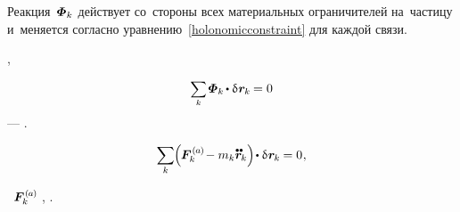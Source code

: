 \begin{otherlanguage}{russian}
Реакция~$\mathboldPhi_k$
действует со~стороны всех материальных ограничителей
на~частицу 
и~меняется согласно уравнению~\eqref{holonomicconstraint}
для каждой связи.

,

\nopagebreak
\begin{equation}\label{theidealityofconstraints}
\scalebox{.9}{$\displaystyle \sum_{\smash{k}}$} \hspace{.2ex} \mathboldPhi_k \hspace{-0.2ex} \dotp \variation{\hspace{.1ex}\locationvector_{\hspace{-0.1ex}k}} \hspace{-0.16ex} = 0
\vspace{-0.25em}\end{equation}
\noindent
\:---
.


\nopagebreak\vspace{-0.2em}
\begin{equation}\label{discrete:principleofvirtualwork}
\displaystyle \sum_{\smash{k}} \hspace{-0.1ex} \Bigl( \hspace{-0.1ex}
\activeforcewithindex{k} \hspace{-0.2ex} - m_k \mathdotdotabove{\locationvector}_{\hspace{-0.1ex}k}
\Bigr) \hspace{-0.3ex} \dotp \variation{\hspace{.1ex}\locationvector_{\hspace{-0.1ex}k}} \hspace{-0.1ex} = 0
\hspace{.1ex} ,
\vspace{-0.3em}
\end{equation}

\vspace{-0.2em}\noindent
{}~${\activeforcewithindex{k}}$\ru{\:---}
,
.


\end{otherlanguage}
